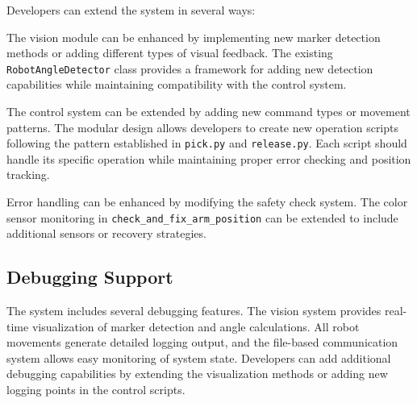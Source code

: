 \documentclass[10pt,twocolumn]{article}
\begin{document}
Developers can extend the system in several ways:

The vision module can be enhanced by implementing new marker detection methods or adding different types of visual feedback. The existing \texttt{RobotAngleDetector} class provides a framework for adding new detection capabilities while maintaining compatibility with the control system.

The control system can be extended by adding new command types or movement patterns. The modular design allows developers to create new operation scripts following the pattern established in \texttt{pick.py} and \texttt{release.py}. Each script should handle its specific operation while maintaining proper error checking and position tracking.

Error handling can be enhanced by modifying the safety check system. The color sensor monitoring in \texttt{check\_and\_fix\_arm\_position} can be extended to include additional sensors or recovery strategies.

\subsection*{Debugging Support}

The system includes several debugging features. The vision system provides real-time visualization of marker detection and angle calculations. All robot movements generate detailed logging output, and the file-based communication system allows easy monitoring of system state. Developers can add additional debugging capabilities by extending the visualization methods or adding new logging points in the control scripts.

\printbibliography
\end{document}

